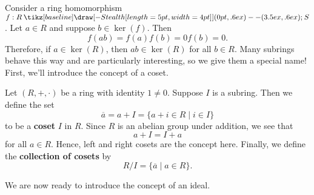 \documentclass[12pt,letterpaper]{algebra_book}
\renewcommand{\to}{\mathbin{\tikz[baseline] \draw[-{Stealth[length=5pt,width=4pt]}] (0pt,.6ex) -- (3.5ex,.6ex);}}
\theoremstyle{definition}
\begin{document}
    Consider a ring
    homomorphism $f: R \to S$. Let $a \in R$ and
    suppose $b \in \ker(f)$. Then 
    \[
        f(ab) = f(a)f(b) = 0f(b) = 0.
    \]
    Therefore, if $a \in \ker(R)$, then $ab \in \ker(R)$ for all
    $b \in R$. Many subrings behave this way and are particularly
    interesting, so we give them a special name! 
    \\
    First, we'll introduce the concept of a coset.
    \begin{definition}
        Let $(R, +, \cdot)$ be a ring with identity $1 \ne 0$. Suppose $I$ is
        a subring. Then we define the set 
        \[
            \overline{a} = a + I = \{a + i \in R \mid i \in I\}   
        \]
        to be a \textbf{coset} $I$ in $R$. Since $R$ is an abelian
        group under addition, we see that 
        \[
            a + I = I + a
        \]
        for all $a \in R$. Hence, left and right cosets are the
        concept here. Finally, we define the \textbf{collection of
        cosets} by 
        \[
            R/I = \{\overline{a} \mid a \in R\}.               
        \]
    \end{definition}
    We are now ready to introduce the concept of an ideal. 
\end{document}
